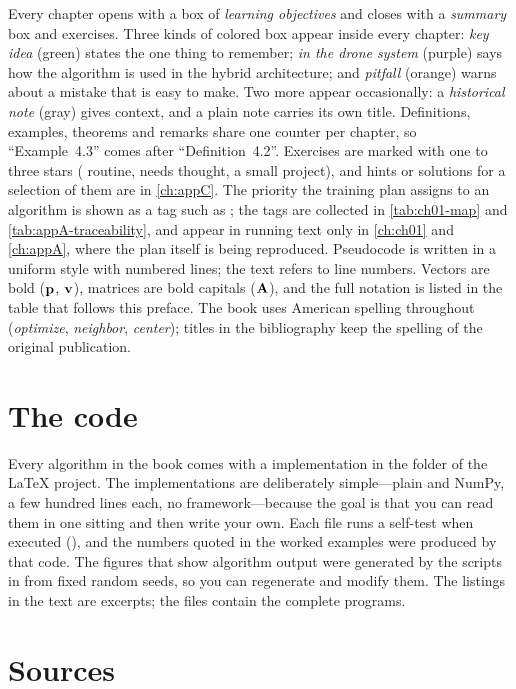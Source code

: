 Every chapter opens with a box of \emph{learning objectives} and closes with a
\emph{summary} box and exercises. Three kinds of colored box appear inside every
chapter: \emph{key idea} (green) states the one thing to remember; \emph{in the drone
system} (purple) says how the algorithm is used in the hybrid architecture; and
\emph{pitfall} (orange) warns about a mistake that is easy to make. Two more appear
occasionally: a \emph{historical note} (gray) gives context, and a plain note carries
its own title. Definitions, examples, theorems and remarks share one counter per
chapter, so ``Example~4.3'' comes after ``Definition~4.2''. Exercises are marked with
one to three stars ( routine,  needs thought,
 a small project), and hints or solutions for a selection of them are in
\cref{ch:appC}. The priority the training plan assigns to an algorithm is shown as a
tag such as ; the tags are collected in \cref{tab:ch01-map} and
\cref{tab:appA-traceability}, and appear in running text only in \cref{ch:ch01} and
\cref{ch:appA}, where the plan itself is being reproduced. Pseudocode is written in a
uniform style with numbered lines;
the text refers to line numbers. Vectors are bold ($\mathbf{p}$, $\mathbf{v}$), matrices are bold
capitals ($\mathbf{A}$), and the full notation is listed in the table that follows this
preface. The book uses American spelling throughout (\emph{optimize}, \emph{neighbor},
\emph{center}); titles in the bibliography keep the spelling of the original publication.

\section*{The code}

Every algorithm in the book comes with a \python{} implementation in the
 folder of the \LaTeX{} project. The implementations are deliberately
simple---plain \python{} and NumPy, a few hundred lines each, no framework---because
the goal is that you can read them in one sitting and then write your own. Each file
runs a self-test when executed (), and the numbers
quoted in the worked examples were produced by that code. The figures that show
algorithm output were generated by the scripts in  from fixed
random seeds, so you can regenerate and modify them. The listings in the text are
excerpts; the files contain the complete programs.

\section*{Sources}

